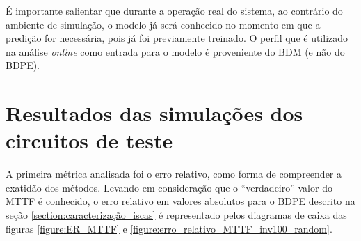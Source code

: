 É importante salientar que durante a operação real do sistema, ao contrário do ambiente de simulação, o modelo já será conhecido no momento em que a predição for necessária, pois já foi previamente treinado. O perfil que é utilizado na análise \textit{online} como entrada para o modelo é proveniente do BDM (e não do BDPE).
\section{Resultados das simulações dos circuitos de teste}
A primeira métrica analisada foi o erro relativo, como forma de compreender a exatidão dos métodos. Levando em consideração que o ``verdadeiro'' valor do MTTF é conhecido, o erro relativo em valores absolutos para o BDPE descrito na seção \ref{section:caracterização_iscas} é representado pelos diagramas de caixa das figuras \ref{figure:ER_MTTF} e \ref{figure:erro_relativo_MTTF_inv100_random}.
